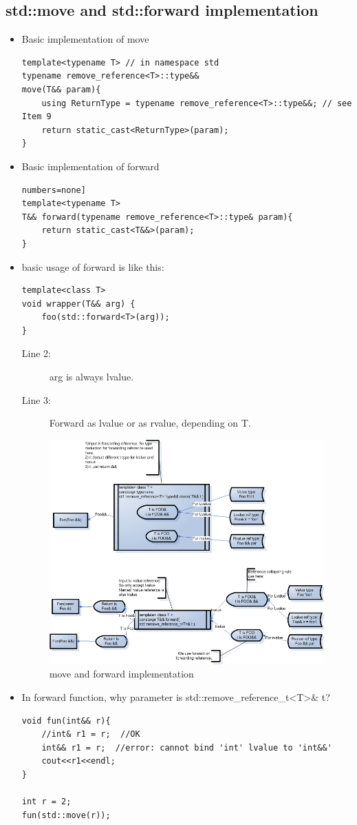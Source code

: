 \documentclass[a4paper,11pt,twoside]{book}
\begin{document}
\subsection{std::move and std::forward implementation}
\begin{itemize}
	\item Basic implementation of move
\begin{lstlisting}[numbers=none]
template<typename T> // in namespace std
typename remove_reference<T>::type&&
move(T&& param){
	using ReturnType = typename remove_reference<T>::type&&; // see Item 9
	return static_cast<ReturnType>(param);
}
\end{lstlisting}
	
	\item Basic implementation of forward
\begin{lstlisting}numbers=none]
template<typename T>
T&& forward(typename remove_reference<T>::type& param){
	return static_cast<T&&>(param);
}
\end{lstlisting}

	\item basic usage of forward is like this:
\begin{lstlisting}
template<class T>
void wrapper(T&& arg) {
	foo(std::forward<T>(arg)); 
}
\end{lstlisting}
\begin{description}
	\item[Line 2:] arg is always lvalue.
	\item[Line 3:] Forward as lvalue or as rvalue, depending on T.
	
	
\end{description}
	\begin{figure}
		\centering
		\includegraphics[width=0.8\linewidth]{pics/rvalue_ref.png}
		\caption{move and forward implementation}
		\label{fig:rvalueref}
	\end{figure}

	\item In forward function, why parameter is std::remove\_reference\_t<T>\& t?
\begin{lstlisting}[numbers=none]
void fun(int&& r){
	//int& r1 = r;  //OK
	int&& r1 = r;  //error: cannot bind 'int' lvalue to 'int&&'
	cout<<r1<<endl;
}

int r = 2;
fun(std::move(r));
\end{lstlisting}

\end{itemize}
\end{document}
